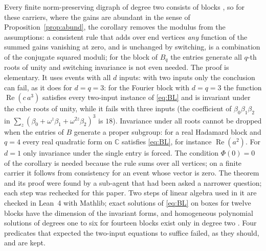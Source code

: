 Every finite norm-preserving digraph of degree two consists of blocks \cite{g9}, so for these carriers, where the gains are abundant in the sense of Proposition~\ref{prop:abund}, the corollary removes the modulus from the assumptions: a consistent rule that adds over end vertices \emph{any} function of the summed gains vanishing at zero, and is unchanged by switching, is a combination of the conjugate squared moduli; for the block of $B_q$ the entries generate all $q$-th roots of unity and switching invariance is not even needed. The proof is elementary. It uses events with all $d$ inputs: with two inputs only the conclusion can fail, as it does for $d=q=3$: for the Fourier block with $d=q=3$ the function $\operatorname{Re}(c\,a^3)$ satisfies every two-input instance of \eqref{eq:BL} and is invariant under the cube roots of unity, while it fails with three inputs (the coefficient of $\beta_0\beta_1\beta_2$ in $\sum_z(\beta_0+\omega^z\beta_1+\omega^{2z}\beta_2)^3$ is $18$). Invariance under all roots cannot be dropped when the entries of $B$ generate a proper subgroup: for a real Hadamard block and $q=4$ every real quadratic form on $\mathbb{C}$ satisfies \eqref{eq:BL}, for instance $\operatorname{Re}(a^2)$. For $d=1$ only invariance under the single entry is forced. The condition $\Phi(0)=0$ of the corollary is needed because the rule sums over all vertices; on a finite carrier it follows from consistency for an event whose vector is zero. The theorem and its proof were found by a sub-agent that had been asked a narrower question; each step was rechecked for this paper. Two steps of linear algebra used in it are checked in Lean~4 with Mathlib; exact solutions of \eqref{eq:BL} on boxes for twelve blocks have the dimension of the invariant forms, and homogeneous polynomial solutions of degrees one to six for fourteen blocks exist only in degree two \cite{comp4s}. Four predicates that expected the two-input equations to suffice failed, as they should, and are kept.

